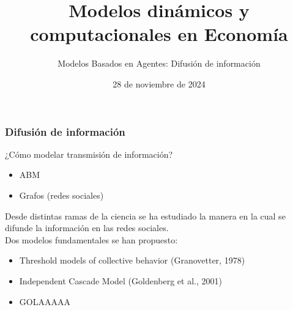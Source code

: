 \documentclass[11pt]{beamer}
\begin{document}
	\title{Modelos dinámicos y computacionales en Economía}
	\subtitle{Modelos Basados en Agentes: Difusión de información}
	\date{28 de noviembre de 2024}




\begin{frame}
	\frametitle{Difusión de información}
	¿Cómo modelar transmisión de información?
	\begin{itemize}
		\item<2-> ABM
		\item<3-> Grafos (redes sociales)
	\end{itemize}
	\vspace{2mm}
	Desde distintas ramas de la ciencia se ha estudiado la manera en la cual se difunde la información en las redes sociales.\\
	Dos modelos fundamentales se han propuesto:
	\begin{itemize}
		\item Threshold models of collective behavior (Granovetter, 1978)
		\item Independent Cascade Model (Goldenberg et al., 2001)
		\item GOLAAAAA
	\end{itemize}
\end{frame}
\end{document}
